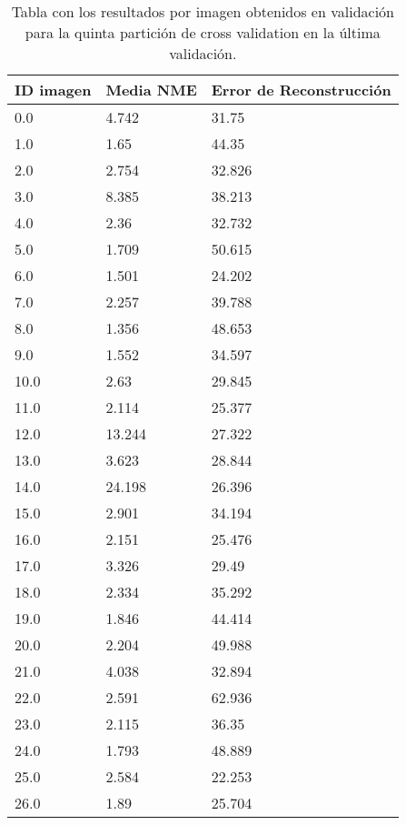 \begin{table}[!ht]
    \centering
    \caption{Tabla con los resultados por imagen obtenidos en validación para la quinta partición de cross validation en la última validación.}
    \begin{tabular}{|l|l|l|}
    \hline
        ID imagen & Media NME & Error de Reconstrucción \\ \hline
        0.0 & 4.742 & 31.75 \\ \hline
        1.0 & 1.65 & 44.35 \\ \hline
        2.0 & 2.754 & 32.826 \\ \hline
        3.0 & 8.385 & 38.213 \\ \hline
        4.0 & 2.36 & 32.732 \\ \hline
        5.0 & 1.709 & 50.615 \\ \hline
        6.0 & 1.501 & 24.202 \\ \hline
        7.0 & 2.257 & 39.788 \\ \hline
        8.0 & 1.356 & 48.653 \\ \hline
        9.0 & 1.552 & 34.597 \\ \hline
        10.0 & 2.63 & 29.845 \\ \hline
        11.0 & 2.114 & 25.377 \\ \hline
        12.0 & 13.244 & 27.322 \\ \hline
        13.0 & 3.623 & 28.844 \\ \hline
        14.0 & 24.198 & 26.396 \\ \hline
        15.0 & 2.901 & 34.194 \\ \hline
        16.0 & 2.151 & 25.476 \\ \hline
        17.0 & 3.326 & 29.49 \\ \hline
        18.0 & 2.334 & 35.292 \\ \hline
        19.0 & 1.846 & 44.414 \\ \hline
        20.0 & 2.204 & 49.988 \\ \hline
        21.0 & 4.038 & 32.894 \\ \hline
        22.0 & 2.591 & 62.936 \\ \hline
        23.0 & 2.115 & 36.35 \\ \hline
        24.0 & 1.793 & 48.889 \\ \hline
        25.0 & 2.584 & 22.253 \\ \hline
        26.0 & 1.89 & 25.704 \\ \hline
    \end{tabular}
    \label{table::ModelBase_Partition5}
\end{table}

\endinput
